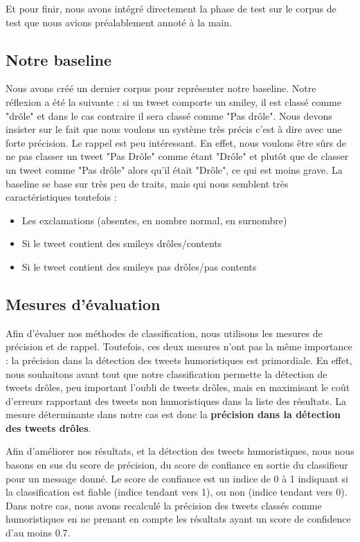 \documentclass[10pt,a4paper,twoside]{article}
\begin{document}
Et pour finir, nous avons intégré directement la phase de test sur le corpus de test que nous avions préalablement annoté à la main.

\subsection{Notre baseline}
Nous avons créé un dernier corpus pour représenter notre baseline. Notre réflexion a été la suivante : si un tweet comporte un smiley, il est classé comme "drôle" et dans le cas contraire il sera classé comme "Pas drôle". Nous devons insister sur le fait que nous voulons un système très précis c'est à dire avec une forte précision. Le rappel est peu intéressant. En effet, nous voulons être sûrs de ne pas classer un tweet "Pas Drôle" comme étant "Drôle" et plutôt que de classer un tweet comme "Pas drôle" alors qu'il était "Drôle", ce qui est moins grave.
La baseline se base sur très peu de traits, mais qui nous semblent très caractéristiques toutefois :
\begin{itemize}
\item Les exclamations (absentes, en nombre normal, en surnombre)
\item Si le tweet contient des smileys drôles/contents
\item Si le tweet contient des smileys pas drôles/pas contents
\end{itemize}

\subsection{Mesures d'évaluation}
Afin d'évaluer nos méthodes de classification, nous utilisons les mesures de précision et de rappel. Toutefois, ces deux mesures n'ont pas la même importance : la précision dans la détection des tweets humoristiques est primordiale. En effet, nous souhaitons avant tout que notre classification permette la détection de tweets drôles, peu important l'oubli de tweets drôles, mais en maximisant le coût d'erreurs rapportant des tweets non humoristiques dans la liste des résultats. La mesure déterminante dans notre cas est donc la \textbf{précision dans la détection des tweets drôles}.

Afin d'améliorer nos résultats, et la détection des tweets humoristiques, nous nous basons en sus du score de précision, du score de confiance en sortie du classifieur pour un message donné. Le score de confiance est un indice de 0 à 1 indiquant si la classification est fiable (indice tendant vers 1), ou non (indice tendant vers 0). Dans notre cas, nous avons recalculé la précision des tweets classés comme humoristiques en ne prenant en compte les résultats ayant un score de confidence d'au moins 0.7.
\end{document}
